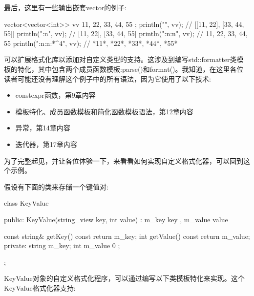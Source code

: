最后，这里有一些输出嵌套vector的例子:

\begin{cpp}
vector<vector<int>> vv { {11, 22}, {33, 44, 55} };
println("{}", vv);          // [[11, 22], [33, 44, 55]]
println("{:n}", vv);        // [11, 22], [33, 44, 55]
println("{:n:n}", vv);      // 11, 22, 33, 44, 55
println("{:n:n:*^4}", vv);  // *11*, *22*, *33*, *44*, *55*
\end{cpp}


可以扩展格式化库以添加对自定义类型的支持。这涉及到编写std::formatter类模板的特化，其中包含两个成员函数模板:parse()和format()。我知道，在这里各位读者可能还没有理解这个例子中的所有语法，因为它使用了以下技术:

\begin{itemize}
\item
constexpr函数，第9章内容

\item
模板特化、成员函数模板和简化函数模板语法，第12章内容

\item
异常，第14章内容

\item
迭代器，第17章内容
\end{itemize}

为了完整起见，并让各位体验一下，来看看如何实现自定义格式化器，可以回到这个示例。

假设有下面的类来存储一个键值对:

\begin{cpp}
class KeyValue
{
    public:
        KeyValue(string_view key, int value) : m_key { key }, m_value { value } {}

        const string& getKey() const { return m_key; }
        int getValue() const { return m_value; }
    private:
        string m_key;
        int m_value { 0 };
};
\end{cpp}

KeyValue对象的自定义格式化程序，可以通过编写以下类模板特化来实现。这个KeyValue格式化器支持:

